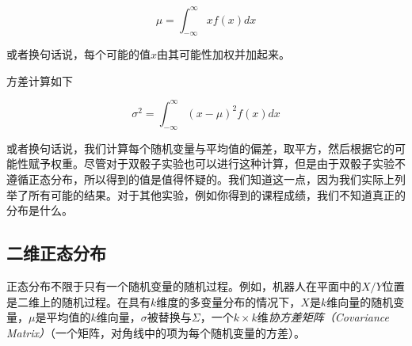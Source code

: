 \begin{equation}
\mu=\int_{-\infty}^{\infty}xf(x)dx
\end{equation}



或者换句话说，每个可能的值$x$由其可能性加权并加起来。

方差计算如下

\begin{equation}
\sigma^2=\int_{-\infty}^{\infty}(x-\mu)^2f(x)dx
\end{equation}


或者换句话说，我们计算每个随机变量与平均值的偏差，取平方，然后根据它的可能性赋予权重。尽管对于双骰子实验也可以进行这种计算，但是由于双骰子实验不遵循正态分布，所以得到的值是值得怀疑的。我们知道这一点，因为我们实际上列举了所有可能的结果。对于其他实验，例如你得到的课程成绩，我们不知道真正的分布是什么。


\subsection{二维正态分布}
正态分布不限于只有一个随机变量的随机过程。例如，机器人在平面中的$X/Y$位置是二维上的随机过程。在具有$k$维度的多变量分布的情况下，$X$是$k$维向量的随机变量，$\mu$是平均值的$k$维向量，$\sigma$被替换与$\Sigma$，一个$k\times k$维\emph{协方差矩阵（Covariance Matrix）}（一个矩阵，对角线中的项为每个随机变量的方差）。

